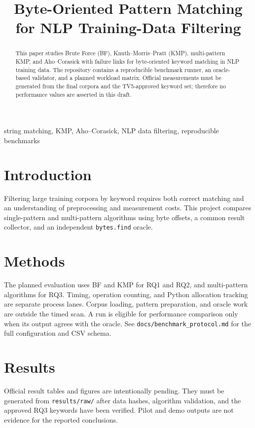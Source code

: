 \documentclass[conference]{IEEEtran}
\title{Byte-Oriented Pattern Matching for NLP Training-Data Filtering}
\author{\IEEEauthorblockN{Group 2}
\IEEEauthorblockA{CSD203, AI21B}}
\begin{document}
\maketitle

\begin{abstract}
This paper studies Brute Force (BF), Knuth--Morris--Pratt (KMP), multi-pattern
KMP, and Aho--Corasick with failure links for byte-oriented keyword matching
in NLP training data. The repository contains a reproducible benchmark runner,
an oracle-based validator, and a planned workload matrix. Official measurements
must be generated from the final corpora and the TV5-approved keyword set;
therefore no performance values are asserted in this draft.
\end{abstract}

\begin{IEEEkeywords}
string matching, KMP, Aho--Corasick, NLP data filtering, reproducible benchmarks
\end{IEEEkeywords}

\section{Introduction}
Filtering large training corpora by keyword requires both correct matching and
an understanding of preprocessing and measurement costs. This project compares
single-pattern and multi-pattern algorithms using byte offsets, a common result
collector, and an independent \texttt{bytes.find} oracle.

\section{Methods}
The planned evaluation uses BF and KMP for RQ1 and RQ2, and multi-pattern
algorithms for RQ3. Timing, operation counting, and Python allocation tracking
are separate process lanes. Corpus loading, pattern preparation, and oracle
work are outside the timed scan. A run is eligible for performance comparison
only when its output agrees with the oracle. See
\texttt{docs/benchmark\_protocol.md} for the full configuration and CSV schema.

\section{Results}
Official result tables and figures are intentionally pending. They must be
generated from \texttt{results/raw/} after data hashes, algorithm validation,
and the approved RQ3 keywords have been verified. Pilot and demo outputs are
not evidence for the reported conclusions.
\end{document}
